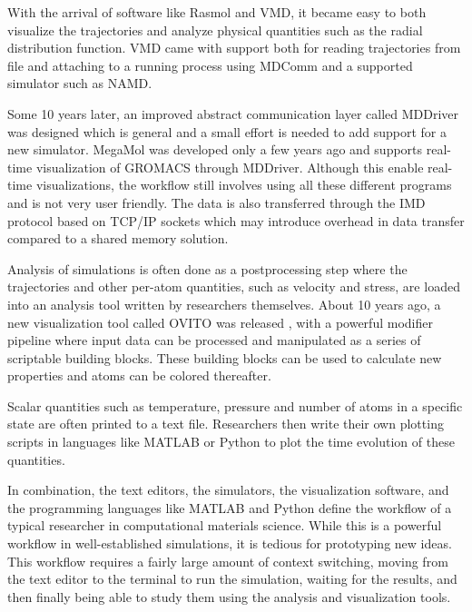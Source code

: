 \documentclass[12pt,a4paper,final]{iopart}
\begin{document}
With the arrival of software like Rasmol\cite{sayle1995rasmol} and VMD\cite{Humphrey1996Vmd},
it became easy to both visualize the trajectories and analyze physical quantities such as the radial distribution function.
VMD came with support both for reading trajectories from file and attaching to a
running process using MDComm\cite{nelson1995mdscope} and a supported simulator such as NAMD.

Some 10 years later, an improved abstract communication layer called MDDriver\cite{delalande2009complex} was designed
which is general and a small effort is needed to add support for a new simulator. MegaMol\cite{grottel2015megamol} was developed
only a few years ago and supports real-time visualization of GROMACS through MDDriver.
Although this enable real-time visualizations, the workflow still involves using all these different programs and is not very user friendly.
The data is also transferred through the IMD protocol based on TCP/IP sockets\cite{delalande2009complex} which may introduce
overhead in data transfer compared to a shared memory solution.

Analysis of simulations is often done as a postprocessing step where the trajectories and other 
per-atom quantities, such as velocity and stress, are loaded into an analysis tool written by researchers themselves.
About 10 years ago, a new visualization tool called OVITO was released \cite{Stukowski2009Visualization},
with a powerful modifier pipeline where input data can be processed and manipulated as a series of scriptable building blocks.
These building blocks can be used to calculate new properties and atoms can be colored thereafter.

Scalar quantities such as temperature, pressure and number of atoms in a specific state are often printed to a
text file. Researchers then write their own plotting scripts in languages like MATLAB or Python
to plot the time evolution of these quantities. 

In combination, the text editors, the simulators, the visualization software, and the programming
languages like MATLAB and Python define the workflow of a typical researcher in computational
materials science.
While this is a powerful workflow in well-established simulations,
it is tedious for prototyping new ideas.
This workflow requires a fairly large amount of context switching,
moving from the text editor to the terminal to run the simulation,
waiting for the results, and then finally being able to study them using the analysis
and visualization tools.
\end{document}
